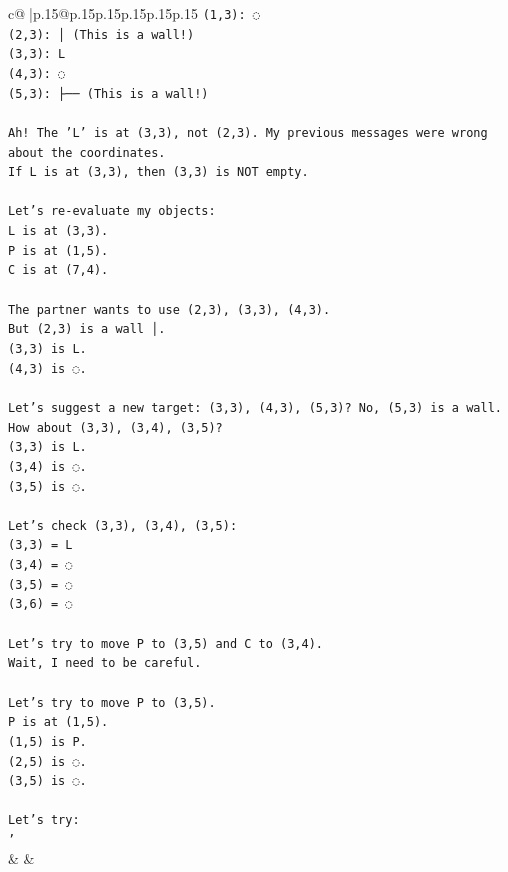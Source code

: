 \documentclass{article}
\begin{document}
{\begin{supertabular}{c@{$\;$}|p{.15\linewidth}@{}p{.15\linewidth}p{.15\linewidth}p{.15\linewidth}p{.15\linewidth}p{.15\linewidth}}
{{{\texttt{(1,3): ◌} \\
\texttt{(2,3): │ (This is a wall!)} \\
\texttt{(3,3): L} \\
\texttt{(4,3): ◌} \\
\texttt{(5,3): ├── (This is a wall!)} \\
\\ 
\texttt{Ah! The 'L' is at (3,3), not (2,3). My previous messages were wrong about the coordinates.} \\
\texttt{If L is at (3,3), then (3,3) is NOT empty.} \\
\\ 
\texttt{Let's re{-}evaluate my objects:} \\
\texttt{L is at (3,3).} \\
\texttt{P is at (1,5).} \\
\texttt{C is at (7,4).} \\
\\ 
\texttt{The partner wants to use (2,3), (3,3), (4,3).} \\
\texttt{But (2,3) is a wall │.} \\
\texttt{(3,3) is L.} \\
\texttt{(4,3) is ◌.} \\
\\ 
\texttt{Let's suggest a new target: (3,3), (4,3), (5,3)? No, (5,3) is a wall.} \\
\texttt{How about (3,3), (3,4), (3,5)?} \\
\texttt{(3,3) is L.} \\
\texttt{(3,4) is ◌.} \\
\texttt{(3,5) is ◌.} \\
\\ 
\texttt{Let's check (3,3), (3,4), (3,5):} \\
\texttt{(3,3) = L} \\
\texttt{(3,4) = ◌} \\
\texttt{(3,5) = ◌} \\
\texttt{(3,6) = ◌} \\
\\ 
\texttt{Let's try to move P to (3,5) and C to (3,4).} \\
\texttt{Wait, I need to be careful.} \\
\\ 
\texttt{Let's try to move P to (3,5).} \\
\texttt{P is at (1,5).} \\
\texttt{(1,5) is P.} \\
\texttt{(2,5) is ◌.} \\
\texttt{(3,5) is ◌.} \\
\\ 
\texttt{Let's try:} \\
\texttt{'} \\
            }
        }
    }
    & & \\ \\


\end{supertabular}}
\end{document}
